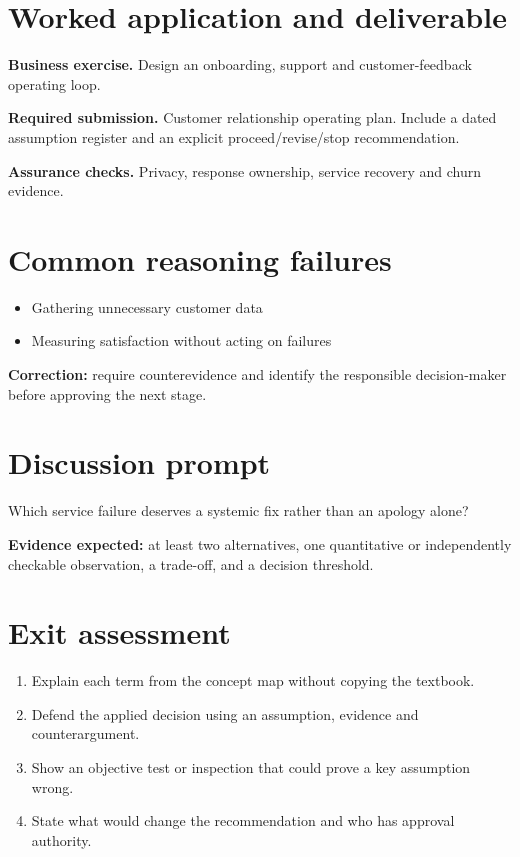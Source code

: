 \documentclass[11pt,letterpaper]{article}
\begin{document}
\section{Worked application and deliverable}
\textbf{Business exercise.} Design an onboarding, support and customer-feedback operating loop.\par\textbf{Required submission.} Customer relationship operating plan. Include a dated assumption register and an explicit proceed/revise/stop recommendation.\par\textbf{Assurance checks.} Privacy, response ownership, service recovery and churn evidence.
\section{Common reasoning failures}
\begin{itemize}[leftmargin=*,itemsep=3pt]
\item Gathering unnecessary customer data
\item Measuring satisfaction without acting on failures
\end{itemize}
\noindent\textbf{Correction:} require counterevidence and identify the responsible decision-maker before approving the next stage.
\section{Discussion prompt}
Which service failure deserves a systemic fix rather than an apology alone?\par\medskip\textbf{Evidence expected:} at least two alternatives, one quantitative or independently checkable observation, a trade-off, and a decision threshold.
\section{Exit assessment}
\begin{enumerate}[leftmargin=*,itemsep=5pt]
\item Explain each term from the concept map without copying the textbook.
\item Defend the applied decision using an assumption, evidence and counterargument.
\item Show an objective test or inspection that could prove a key assumption wrong.
\item State what would change the recommendation and who has approval authority.
\end{enumerate}

\end{document}
